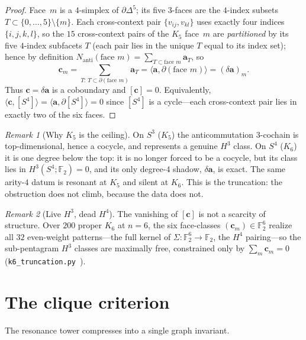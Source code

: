 \documentclass[11pt,a4paper]{article}
\newcommand{\Nanti}{N_{\mathrm{anti}}}
\newcommand{\F}{\mathbb{F}}
\theoremstyle{plain}
\theoremstyle{definition}
\theoremstyle{remark}
\newtheorem*{remark}{Remark}
\begin{document}
\begin{proof}
Face~$m$ is a $4$-simplex of $\partial\Delta^5$; its five $3$-faces are the
$4$-index subsets $T\subset\{0,\dots,5\}\setminus\{m\}$.  Each cross-context pair
$\{v_{ij},v_{kl}\}$ uses exactly four indices $\{i,j,k,l\}$, so the $15$
cross-context pairs of the $K_5$ face~$m$ are \emph{partitioned} by its five
$4$-index subfacets $T$ (each pair lies in the unique $T$ equal to its index set);
hence by definition $\Nanti(\text{face }m)=\sum_{T\subset\text{face }m}\mathbf a_T$, so
\[
  \mathbf c_m=\sum_{T:\,T\subset\partial(\text{face }m)}\mathbf a_T
            =\langle\mathbf a,\partial(\text{face }m)\rangle
            =(\delta\mathbf a)_m .
\]
Thus $\mathbf c=\delta\mathbf a$ is a coboundary and $[\mathbf c]=0$.  Equivalently,
$\langle\mathbf c,[S^4]\rangle=\langle\mathbf a,\partial[S^4]\rangle=0$ since $[S^4]$
is a cycle---each cross-context pair lies in exactly two of the six faces.
\end{proof}

\begin{remark}[Why $K_5$ is the ceiling]
On $S^3$ ($K_5$) the anticommutation $3$-cochain is top-dimensional, hence a cocycle,
and represents a genuine $H^3$ class.  On $S^4$ ($K_6$) it is one degree below the
top: it is no longer forced to be a cocycle, but its class lies in
$H^3(S^4;\F_2)=0$, and its only degree-$4$ shadow, $\delta\mathbf a$, is exact.
The same arity-$4$ datum is resonant at $K_5$ and silent at $K_6$.  This is the
truncation: the obstruction does not climb, because the data does not.
\end{remark}

\begin{remark}[Live $H^3$, dead $H^4$]
The vanishing of $[\mathbf c]$ is not a scarcity of structure.  Over $200$ proper
$K_6$ at $n=6$, the six face-classes $(\mathbf c_m)\in\F_2^6$ realize all $32$
even-weight patterns---the full kernel of $\Sigma\colon\F_2^6\to\F_2$, the $H^4$
pairing---so the sub-pentagram $H^3$ classes are maximally free, constrained only by
$\sum_m\mathbf c_m=0$ (\texttt{k6\_truncation.py}~\cite{PaperXXIIsuppl}).
\end{remark}

\section{The clique criterion}\label{sec:clique}

The resonance tower compresses into a single graph invariant.
\end{document}
